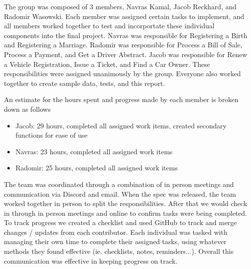The group was composed of 3 members, Navras Kamal, Jacob Reckhard, and Radomir Wasowski.  Each member was assigned certain tasks to implement, and all members worked together to test and incorportate these individual components into the final project.  Navras was responsible for Registering a Birth and Registering a Marriage.  Radomir was responsible for Process a Bill of Sale, Process a Payment, and Get a Driver Abstract.  Jacob was responsible for Renew a Vehicle Registration, Issue a Ticket, and Find a Car Owner.  These responsibilities were assigned unanimously by the group.  Everyone also worked together to create sample data, tests, and this report.  

An estimate for the hours spent and progress made by each member is broken down as follows
\begin{itemize}
\item{Jacob: 29 hours, completed all assigned work items, created secondary functions for ease of use}
\item{Navras: 23 hours, completed all assigned work items}
\item{Radomir: 25 hours, completed all assigned work items}
\end{itemize}

The team was coordinated through a combination of in person meetings and communication via Discord and email.  When the spec was released, the team worked together in person to split the responsibilities.  After that we would check in through in person meetings and online to confirm tasks were being completed.  To track progress we created a checklist and used GitHub to track and merge changes / updates from each contributor.  Each individual was tasked with managing their own time to complete their assigned tasks, using whatever methods they found effective (ie. checklists, notes, reminders...).  Overall this communication was effective in keeping progress on track.  
